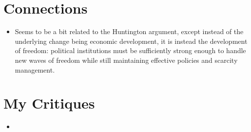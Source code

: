 \documentclass[12pt]{article}
\begin{document}
\section{Connections}

\begin{itemize}
    \item Seems to be a bit related to the Huntington argument, except instead of the underlying change being economic development, it is instead the development of freedom: political institutions must be sufficiently strong enough to handle new waves of freedom while still maintaining effective policies and scarcity management.
\end{itemize}


\section{My Critiques}

\begin{itemize}
    \item
\end{itemize}
\end{document}
